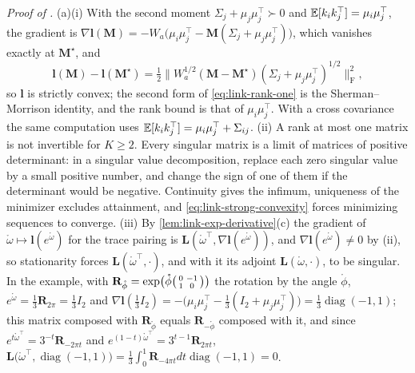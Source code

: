 \noindent\emph{Proof of .}
(a)(i) With the second moment $\Sigma_j+\mu_j\mu_j^\top\succ0$ and $\mathbb E[k_ik_j^\top]=\mu_i\mu_j^\top$, the gradient is
$\nabla\mathbf l(\mathbf M)=-W_a\bigl(\mu_i\mu_j^\top-\mathbf M(\Sigma_j+\mu_j\mu_j^\top)\bigr)$, which vanishes exactly at
$\mathbf M^\star$, and
\begin{equation}
\mathbf l(\mathbf M)-\mathbf l(\mathbf M^\star)
=\tfrac12\bigl\lVert W_a^{1/2}(\mathbf M-\mathbf M^\star)(\Sigma_j+\mu_j\mu_j^\top)^{1/2}\bigr\rVert_{\mathrm F}^2,
\label{eq:link-strong-convexity}
\end{equation}
so $\mathbf l$ is strictly convex; the second form of \eqref{eq:link-rank-one} is the Sherman--Morrison
identity, and the rank bound is that of $\mu_i\mu_j^\top$. With a cross covariance the same computation uses
$\mathbb E[k_ik_j^\top]=\mu_i\mu_j^\top+\Sigma_{ij}$. (ii) A rank at most one matrix is not invertible for $K\geq2$. Every
singular matrix is a limit of matrices of positive determinant: in a singular value decomposition, replace
each zero singular value by a small positive number, and change the sign of one of them if the determinant
would be negative. Continuity gives the infimum, uniqueness of the minimizer excludes attainment, and
\eqref{eq:link-strong-convexity} forces minimizing sequences to converge. (iii) By
\cref{lem:link-exp-derivative}(c) the gradient of $\mathring\omega\mapsto\mathbf l(e^{\mathring\omega})$ for the trace
pairing is $\mathbf L(\mathring\omega^\top,\nabla\mathbf l(e^{\mathring\omega}))$, and $\nabla\mathbf l(e^{\mathring\omega})\neq0$ by (ii), so
stationarity forces $\mathbf L(\mathring\omega^\top,\cdot)$, and with it its adjoint $\mathbf L(\mathring\omega,\cdot)$, to be
singular. In the example, with
$\mathbf R_{\mathring\phi}=\exp\bigl(\mathring\phi\begin{psmallmatrix}0&-1\\1&0\end{psmallmatrix}\bigr)$ the rotation by the
angle $\mathring\phi$, $e^{\mathring\omega}=\frac13\mathbf R_{2\pi}=\frac13I_2$ and
$\nabla\mathbf l(\frac13I_2)=-\bigl(\mu_i\mu_j^\top-\frac13(I_2+\mu_j\mu_j^\top)\bigr)=\frac13\operatorname{diag}(-1,1)$;
this matrix composed with $\mathbf R_{\mathring\phi}$ equals $\mathbf R_{-\mathring\phi}$ composed with it, and since
$e^{t\mathring\omega^\top}=3^{-t}\mathbf R_{-2\pi t}$ and $e^{(1-t)\mathring\omega^\top}=3^{t-1}\mathbf R_{2\pi t}$,
$\mathbf L\bigl(\mathring\omega^\top,\operatorname{diag}(-1,1)\bigr)=\frac13\int_0^1\mathbf R_{-4\pi t}dt\operatorname{diag}(-1,1)=0$.

